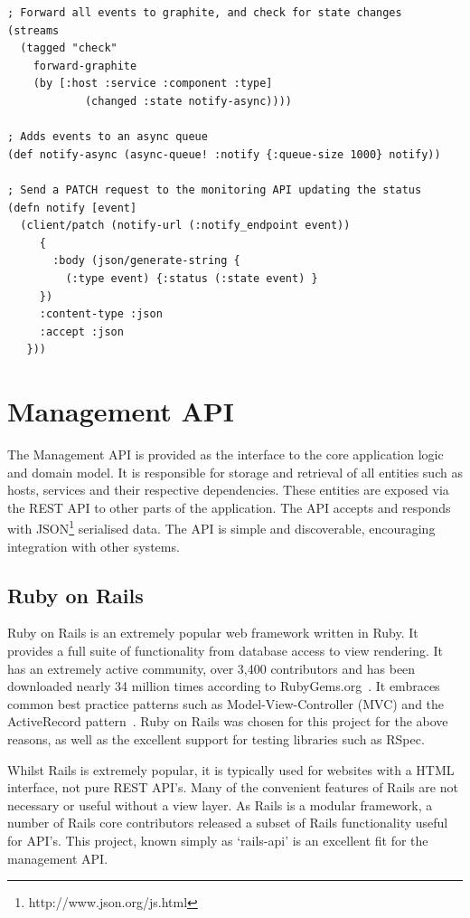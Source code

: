 \documentclass{cshonours}
\begin{document}
\begin{listing}[htbp]
\begin{verbatim}
; Forward all events to graphite, and check for state changes
(streams
  (tagged "check"
    forward-graphite
    (by [:host :service :component :type]
            (changed :state notify-async))))

; Adds events to an async queue
(def notify-async (async-queue! :notify {:queue-size 1000} notify))

; Send a PATCH request to the monitoring API updating the status
(defn notify [event]
  (client/patch (notify-url (:notify_endpoint event))
     {
       :body (json/generate-string {
         (:type event) {:status (:state event) }
     })
     :content-type :json
     :accept :json
   }))
\end{verbatim}
\end{listing}

\pagebreak
\section{Management API}

The Management API is provided as the interface to the core application logic and domain model. It is responsible for storage and retrieval of all entities such as hosts, services and their respective dependencies. These entities are exposed via the REST API to other parts of the application. The API accepts and responds with JSON\footnote{http://www.json.org/js.html} serialised data. The API is simple and discoverable, encouraging integration with other systems.

\subsection{Ruby on Rails}

Ruby on Rails is an extremely popular web framework written in Ruby. It provides a full suite of functionality from database access to view rendering. It has an extremely active community, over 3,400 contributors\cite{RailsContrib} and has been downloaded nearly 34 million times according to RubyGems.org~\cite{RailsPopularity}. It embraces common best practice patterns such as Model-View-Controller (MVC) and the ActiveRecord pattern~\cite{ActiveRecord}. Ruby on Rails was chosen for this project for the above reasons, as well as the excellent support for testing libraries such as RSpec.

Whilst Rails is extremely popular, it is typically used for websites with a HTML interface, not pure REST API's. Many of the convenient features of Rails are not necessary or useful without a view layer. As Rails is a modular framework, a number of Rails core contributors released a subset of Rails functionality useful for API's. This project, known simply as `rails-api' is an excellent fit for the management API.
\end{document}
